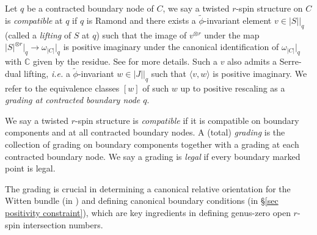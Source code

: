 \documentclass[11pt]{amsart}
\theoremstyle{definition}
\theoremstyle{remark}
\newcommand{\<}{\left<}
\renewcommand{\>}{\right>}
\numberwithin{equation}{section}
\begin{document}
Let $q$ be a contracted boundary node of $C$, we say a twisted $r$-spin structure on $C$ is \textit{compatible} at $q$ if $q$ is Ramond and there exists a $\widetilde{\phi}$-invariant element $v \in |S|\big|_q$  (called a \textit{lifting} of $S$ at $q$) such that the image of $v^{\otimes r}$ under the map $|S|^{\otimes r}\big|_q \to \omega_{|C|}\big|_q$ is positive imaginary under the canonical identification of $\omega_{|C|}\big|_q$ with ${\mathbb{C}}$ given by the residue. See \cite[Definition 2.8]{BCT1} for more details.  Such a $v$ also admits a Serre-dual lifting, \textit{i.e.}  a $\widetilde{\phi}$-invariant $w \in |J|\big\vert_q$ such that $\langle v, w \rangle$ is positive imaginary.  We refer to the equivalence classes $[w]$ of such $w$ up to positive rescaling as a \textit{grading at contracted boundary node $q$}.

We say a twisted $r$-spin structure is \textit{compatible} if it is compatible on boundary components and at all contracted boundary nodes.  A (total) \textit{grading} is the collection of grading on boundary components together with a grading at each contracted boundary node. We say a grading is \textit{legal} if every boundary marked point is legal.


The grading is crucial in determining a canonical relative orientation for the Witten bundle (in \cite{TZ1}) and defining canonical boundary conditions (in \S \ref{sec positivity constraint}), which are key ingredients in defining genus-zero open $r$-spin intersection numbers.
\end{document}
